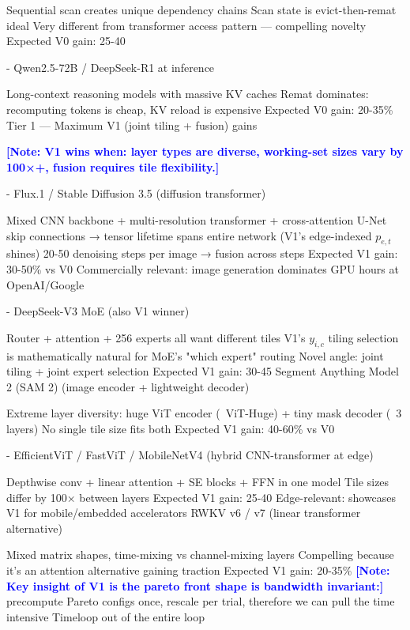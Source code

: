 \documentclass{article}
\renewcommand{\mnote}[1]{\textcolor{blue}{\textbf{[Note: #1]}}}
\begin{document}
Sequential scan creates unique dependency chains
Scan state is evict-then-remat ideal
Very different from transformer access pattern — compelling novelty
Expected V0 gain: 25-40%

- Qwen2.5-72B / DeepSeek-R1 at inference

Long-context reasoning models with massive KV caches
Remat dominates: recomputing tokens is cheap, KV reload is expensive
Expected V0 gain: 20-35\%
Tier 1 — Maximum V1 (joint tiling + fusion) gains

\mnote{V1 wins when: layer types are diverse, working-set sizes vary by 100×+, fusion requires tile flexibility.}

- Flux.1 / Stable Diffusion 3.5 (diffusion transformer)

Mixed CNN backbone + multi-resolution transformer + cross-attention
U-Net skip connections → tensor lifetime spans entire network (V1's edge-indexed $p_{e,t}$ shines)
20-50 denoising steps per image → fusion across steps
Expected V1 gain: 30-50\% vs V0
Commercially relevant: image generation dominates GPU hours at OpenAI/Google


- DeepSeek-V3 MoE (also V1 winner)

Router + attention + 256 experts all want different tiles
V1's $y_{i,c}$ tiling selection is mathematically natural for MoE's "which expert" routing
Novel angle: joint tiling + joint expert selection
Expected V1 gain: 30-45%
Segment Anything Model 2 (SAM 2) (image encoder + lightweight decoder)

Extreme layer diversity: huge ViT encoder (~ViT-Huge) + tiny mask decoder (~3 layers)
No single tile size fits both
Expected V1 gain: 40-60\% vs V0


- EfficientViT / FastViT / MobileNetV4 (hybrid CNN-transformer at edge)

Depthwise conv + linear attention + SE blocks + FFN in one model
Tile sizes differ by 100× between layers
Expected V1 gain: 25-40%
Edge-relevant: showcases V1 for mobile/embedded accelerators
RWKV v6 / v7 (linear transformer alternative)

Mixed matrix shapes, time-mixing vs channel-mixing layers
Compelling because it's an attention alternative gaining traction
Expected V1 gain: 20-35\%
\newpage
%
\mnote{Key insight of V1 is  the pareto front shape is bandwidth invariant:} precompute Pareto configs once, rescale per trial, therefore we can pull the time intensive Timeloop out of the entire loop
\end{document}
